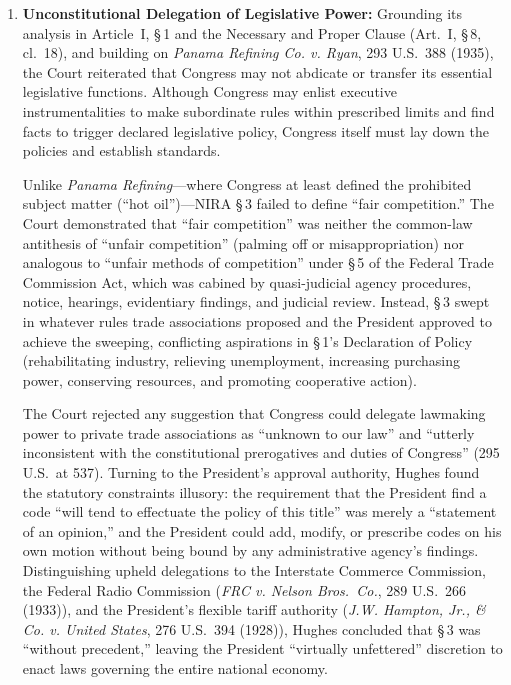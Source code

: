 \documentclass[12pt]{article}
\begin{document}
\begin{enumerate}
  \item \textbf{Unconstitutional Delegation of Legislative Power:} Grounding its analysis in Article~I, \S\,1 and the Necessary and Proper Clause (Art.\ I, \S\,8, cl.\ 18), and building on \textit{Panama Refining Co. v. Ryan}, 293 U.S.\ 388 (1935), the Court reiterated that Congress may not abdicate or transfer its essential legislative functions. Although Congress may enlist executive instrumentalities to make subordinate rules within prescribed limits and find facts to trigger declared legislative policy, Congress itself must lay down the policies and establish standards.

  Unlike \textit{Panama Refining}---where Congress at least defined the prohibited subject matter (``hot oil'')---NIRA \S\,3 failed to define ``fair competition.'' The Court demonstrated that ``fair competition'' was neither the common-law antithesis of ``unfair competition'' (palming off or misappropriation) nor analogous to ``unfair methods of competition'' under \S\,5 of the Federal Trade Commission Act, which was cabined by quasi-judicial agency procedures, notice, hearings, evidentiary findings, and judicial review. Instead, \S\,3 swept in whatever rules trade associations proposed and the President approved to achieve the sweeping, conflicting aspirations in \S\,1's Declaration of Policy (rehabilitating industry, relieving unemployment, increasing purchasing power, conserving resources, and promoting cooperative action).

  The Court rejected any suggestion that Congress could delegate lawmaking power to private trade associations as ``unknown to our law'' and ``utterly inconsistent with the constitutional prerogatives and duties of Congress'' (295 U.S.\ at 537). Turning to the President's approval authority, Hughes found the statutory constraints illusory: the requirement that the President find a code ``will tend to effectuate the policy of this title'' was merely a ``statement of an opinion,'' and the President could add, modify, or prescribe codes on his own motion without being bound by any administrative agency's findings. Distinguishing upheld delegations to the Interstate Commerce Commission, the Federal Radio Commission (\textit{FRC v. Nelson Bros.\ Co.}, 289 U.S.\ 266 (1933)), and the President's flexible tariff authority (\textit{J.W. Hampton, Jr., \& Co. v. United States}, 276 U.S.\ 394 (1928)), Hughes concluded that \S\,3 was ``without precedent,'' leaving the President ``virtually unfettered'' discretion to enact laws governing the entire national economy.


\end{enumerate}
\end{document}
